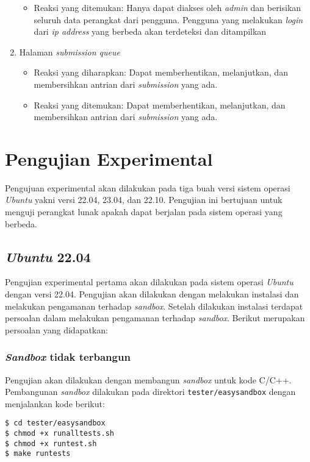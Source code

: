 \begin{enumerate}
\begin{itemize}
	 	\item Reaksi yang ditemukan: Hanya dapat diakses oleh \textit{admin} dan berisikan seluruh data perangkat dari pengguna. Pengguna yang melakukan \textit{login} dari \textit{ip address} yang berbeda akan terdeteksi dan ditampilkan
	 \end{itemize}
	 \item Halaman \textit{submission queue}
	 \begin{itemize}
	 	\item Reaksi yang diharapkan: Dapat memberhentikan, melanjutkan, dan membersihkan antrian dari \textit{submission} yang ada.
	 	\item Reaksi yang ditemukan: Dapat memberhentikan, melanjutkan, dan membersihkan antrian dari \textit{submission} yang ada.
	 \end{itemize}
\end{enumerate}

\section{Pengujian Experimental}
Pengujuan experimental akan dilakukan pada tiga buah versi sistem operasi \textit{Ubuntu} yakni versi 22.04, 23.04, dan 22.10. Pengujian ini bertujuan untuk menguji perangkat lunak apakah dapat berjalan pada sistem operasi yang berbeda.

\subsection{\textit{Ubuntu} 22.04}
Pengujian experimental pertama akan dilakukan pada sistem operasi \textit{Ubuntu} dengan versi 22.04. Pengujian akan dilakukan dengan melakukan instalasi dan melakukan pengamanan terhadap \textit{sandbox}. Setelah dilakukan instalasi terdapat persoalan dalam melakukan pengamanan terhadap \textit{sandbox}. Berikut merupakan persoalan yang didapatkan:
\subsubsection{\textit{Sandbox} tidak terbangun}
Pengujian akan dilakukan dengan membangun \textit{sandbox} untuk kode C/C++. Pembangunan \textit{sandbox} dilakukan pada direktori \texttt{tester/easysandbox} dengan menjalankan kode berikut:
\begin{lstlisting}[caption=Pembangunan \textit{sandbox} pada \textit{Ubuntu} 22.04, label=kode:sandbox2204]
$ cd tester/easysandbox
$ chmod +x runalltests.sh
$ chmod +x runtest.sh
$ make runtests
\end{lstlisting}

